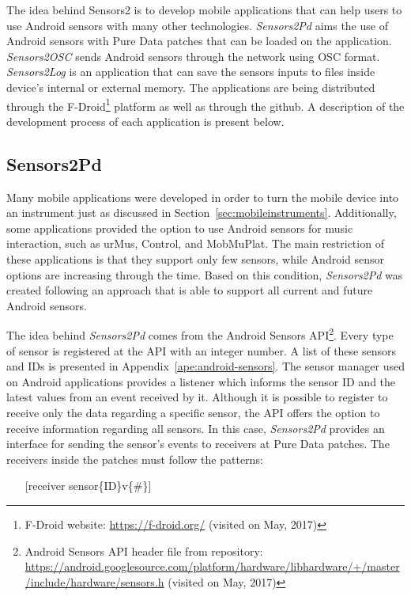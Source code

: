 The idea behind Sensors2 is to develop mobile applications that can help users to use Android sensors with many other technologies.
\textit{Sensors2Pd} aims the use of Android sensors with Pure Data patches that can be loaded on the application.
\textit{Sensors2OSC} sends Android sensors through the network using OSC format.
\textit{Sensors2Log} is an application that can save the sensors inputs to files inside device's internal or external memory.
The applications are being distributed through the F-Droid\footnote{F-Droid website: \url{https://f-droid.org/} (visited on May, 2017)} platform as well as through the github.
A description of the development process of each application is present below.

\subsection*{Sensors2Pd}
\label{apesubsec:appsensors2pd}

Many mobile applications were developed in order to turn the mobile device into an instrument just as discussed in Section~\ref{sec:mobileinstruments}.
Additionally, some applications provided the option to use Android sensors for music interaction, such as urMus, Control, and MobMuPlat.
The main restriction of these applications is that they support only few sensors, while Android sensor options are increasing through the time.
Based on this condition, \textit{Sensors2Pd} was created following an approach that is able to support all current and future Android sensors.

The idea behind \textit{Sensors2Pd} comes from the Android Sensors API\footnote{Android Sensors API header file from repository: \url{https://android.googlesource.com/platform/hardware/libhardware/+/master/include/hardware/sensors.h} (visited on May, 2017)}.
Every type of sensor is registered at the API with an integer number.
A list of these sensors and IDs is presented in Appendix~\ref{ape:android-sensors}.
The sensor manager used on Android applications provides a listener which informs the sensor ID and the latest values from an event received by it.
Although it is possible to register to receive only the data regarding a specific sensor, the API offers the option to receive information regarding all sensors.
In this case, \textit{Sensors2Pd} provides an interface for sending the sensor's events to receivers at Pure Data patches.
The receivers inside the patches must follow the patterns:

\begin{itemize}\itemsep0em
	\item[] [receiver sensor\{ID\}v\{\#\}]
\end{itemize}

